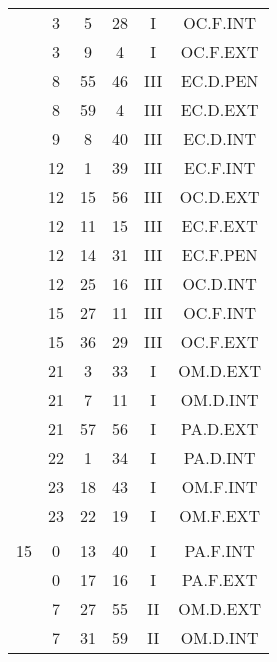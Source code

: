 \documentclass[12pt, a4paper]{article}
\begin{document}
\begin{multicols}{3}
{\begin{tabular}{c c c c c c}
	 	 	 	 & 3 & 5 & 28 & I & OC.F.INT\\%
	 	 	 	 & 3 & 9 & 4 & I & OC.F.EXT\\%
	 	 	 	 & 8 & 55 & 46 & III & EC.D.PEN\\%
	 	 	 	 & 8 & 59 & 4 & III & EC.D.EXT\\%
	 	 	 	 & 9 & 8 & 40 & III & EC.D.INT\\%
	 	 	 	 & 12 & 1 & 39 & III & EC.F.INT\\%
	 	 	 	 & 12 & 15 & 56 & III & OC.D.EXT\\%
	 	 	 	 & 12 & 11 & 15 & III & EC.F.EXT\\%
	 	 	 	 & 12 & 14 & 31 & III & EC.F.PEN\\%
	 	 	 	 & 12 & 25 & 16 & III & OC.D.INT\\%
	 	 	 	 & 15 & 27 & 11 & III & OC.F.INT\\%
	 	 	 	 & 15 & 36 & 29 & III & OC.F.EXT\\%
	 	 	 	 & 21 & 3 & 33 & I & OM.D.EXT\\%
	 	 	 	 & 21 & 7 & 11 & I & OM.D.INT\\%
	 	 	 	 & 21 & 57 & 56 & I & PA.D.EXT\\%
	 	 	 	 & 22 & 1 & 34 & I & PA.D.INT\\%
	 	 	 	 & 23 & 18 & 43 & I & OM.F.INT\\%
	 	 	 	 & 23 & 22 & 19 & I & OM.F.EXT\\%
	 	 	 	 & & & & & \\%
	 	 	 	15 & 0 & 13 & 40 & I & PA.F.INT\\%
	 	 	 	 & 0 & 17 & 16 & I & PA.F.EXT\\%
	 	 	 	 & 7 & 27 & 55 & II & OM.D.EXT\\%
	 	 	 	 & 7 & 31 & 59 & II & OM.D.INT\\%

\end{tabular}}
\end{multicols}
\end{document}
